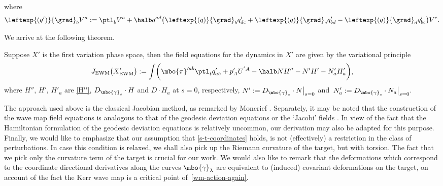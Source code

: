where
\[
\leftexp{(q')}{\grad}_b V^a := \ptl_b V^a+ \halb q^{ad} \bigl(\leftexp{(q)}{\grad}_b q'_{dc} + \leftexp{(q)}{\grad}_c q'_{bd} -\leftexp{(q)}{\grad}_d q'_{bc} \bigr) V^c.
\]

We arrive at the following theorem.

\begin{Corollary}\label{second-var}
Suppose $X'$ is the first variation phase space, then the field equations for the dynamics in $X'$ are given by the variational principle
\begin{align*}
J_{{\rm EWM}} \bigl(X'_{{\rm EWM}}\bigr) := \int \biggl(\mbo{\pi}'^{ab} \ptl_t q'_{ab} + p'_A U^{'A} - \halb N H'' - N' H' - N'_a H'_a \biggr),
\end{align*}
where $H''$, $H'$, $H'_a$ are \eqref{H''}, $D_{\mbo{\gamma}_s} \cdot H$ and $D \cdot H_a$ at $s=0$, respectively, $N' := D_{\mbo{\gamma}_s} \cdot N \big\vert_{s=0}$ and~${N'_a := D_{\mbo{\gamma}_s} \cdot N_a \big\vert_{s=0}}$.
\end{Corollary}

The approach used above is the classical Jacobian method, as remarked by Moncrief \cite{Moncrief_74}. Separately, it may be noted that the construction of the wave map field equations is analogous to that of the geodesic deviation equations or the `Jacobi' fields \cite{Misn_78, synge_34}. In view of the fact that the Hamiltonian formulation of the geodesic deviation equations is relatively uncommon, our derivation may also be adapted for this purpose. Finally, we would like to emphasize that our assumption that \eqref{s-t-coordinates} holds, is not (effectively) a restriction in the class of perturbations. In case this condition is relaxed, we shall also pick up the Riemann curvature of the target, but with torsion. The fact that we pick only the curvature term of the target is crucial for our work. We would also like to remark that the deformations which correspond to the coordinate directional derivatives along the curves $\mbo{\gamma}_\lambda$ are equivalent to (induced) covariant deformations on the target, on account of the fact the Kerr wave map is a critical point of~\eqref{wm-action-again}.

